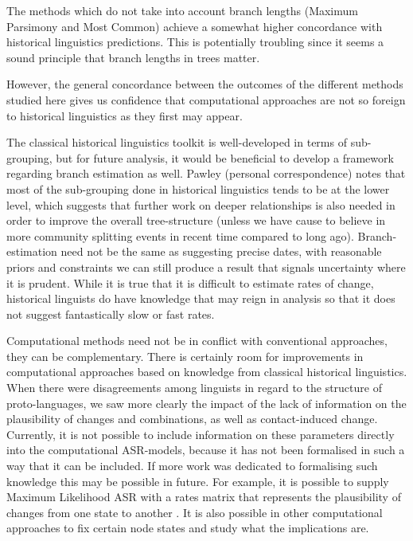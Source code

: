 \documentclass[12pt,letterpaper]{article}
\begin{document}
The methods which do not take into account branch lengths (Maximum Parsimony and Most Common) achieve a somewhat higher concordance with historical linguistics predictions. This is potentially troubling since it seems a sound principle that branch lengths in trees matter.

However, the general concordance between the outcomes of the different methods studied here gives us confidence that computational approaches are not so foreign to historical linguistics as they first may appear. 

The classical historical linguistics toolkit is well-developed in terms of sub-grouping, but for future analysis, it would be beneficial to develop a framework regarding branch estimation as well. Pawley (personal correspondence) notes that most of the sub-grouping done in historical linguistics tends to be at the lower level, which suggests that further work on deeper relationships is also needed in order to improve the overall tree-structure (unless we have cause to believe in more community splitting events in recent time compared to long ago). Branch-estimation need not be the same as suggesting precise dates, with reasonable priors and constraints we can still produce a result that signals uncertainty where it is prudent. While it is true that it is difficult to estimate rates of change, historical linguists do have knowledge that may reign in analysis so that it does not suggest fantastically slow or fast rates.

Computational methods need not be in conflict with conventional approaches, they can be complementary. There is certainly room for improvements in computational approaches based on knowledge from classical historical linguistics. When there were disagreements among linguists in regard to the structure of proto-languages, we saw more clearly the impact of the lack of information on the plausibility of changes and combinations, as well as contact-induced change. Currently, it is not possible to include information on these parameters directly into the computational ASR-models, because it has not been formalised in such a way that it can be included. If more work was dedicated to formalising such knowledge this may be possible in future. For example, it is possible to supply Maximum Likelihood ASR with a rates matrix that represents the plausibility of changes from one state to another \citep[8-9]{R-corHMM}. It is also possible in other computational approaches to fix certain node states and study what the implications are.
\end{document}

